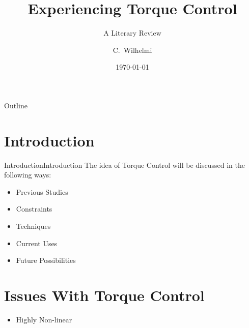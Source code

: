 \documentclass{beamer}
\title[Torque Control] %
{Experiencing Torque Control}
\subtitle
{A Literary Review} %
\author[Wilhelmi] %
{C.~Wilhelmi}%
\institute[George Mason University] %
{
  George Mason University \\
  Fairfax, VA
  
}
\date[ ] %
{\today}
\begin{document}
\begin{frame}
  \titlepage
\end{frame}

\begin{frame}{Outline}
  \tableofcontents
\end{frame}




\section[Introduction]{Introduction}


\begin{frame}{Introduction}{Introduction}
The idea of Torque Control will be discussed in the following ways:
\begin{itemize}
	\item Previous Studies
	\item Constraints
	\item Techniques  
	\item Current Uses
	\item Future Possibilities
\end{itemize}  

\end{frame}

\section[Issues]{Issues With Torque Control}
\begin{frame}
\begin{itemize}
	\item Highly Non-linear \cite{SONG2005208,1035149}
\end{itemize}
\end{frame}
\end{document}
